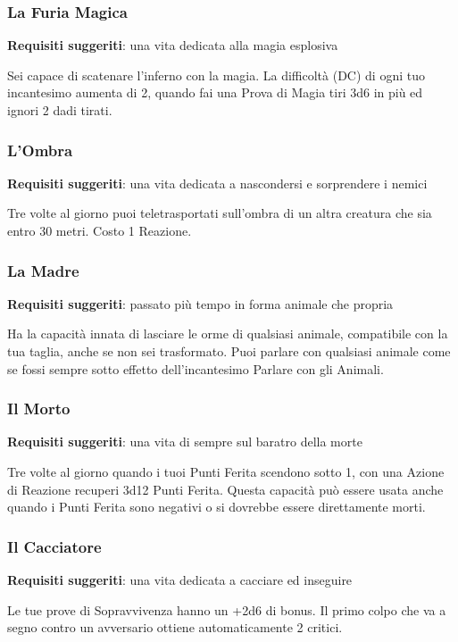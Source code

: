 \begin{multicols}{2}
\subsubsection{La Furia Magica}

\textbf{Requisiti suggeriti}: una vita dedicata alla magia esplosiva

Sei capace di scatenare l'inferno con la magia. La difficoltà (DC) di ogni tuo incantesimo aumenta di 2, quando fai una Prova di Magia tiri 3d6 in più ed ignori 2 dadi tirati.

\subsubsection{L'Ombra}

\textbf{Requisiti suggeriti}: una vita dedicata a nascondersi e sorprendere i nemici

Tre volte al giorno puoi teletrasportati sull'ombra di un altra creatura che sia entro 30 metri. Costo 1 Reazione.

\subsubsection{La Madre}

\textbf{Requisiti suggeriti}: passato più tempo in forma animale che propria

Ha la capacità innata di lasciare le orme di qualsiasi animale, compatibile con la tua taglia, anche se non sei trasformato. Puoi parlare con qualsiasi animale come se fossi sempre sotto effetto dell'incantesimo Parlare con gli Animali.

\subsubsection{Il Morto}

\textbf{Requisiti suggeriti}: una vita di sempre sul baratro della morte

Tre volte al giorno quando i tuoi Punti Ferita scendono sotto 1, con una Azione di Reazione recuperi 3d12 Punti Ferita. Questa capacità può essere usata anche quando i Punti Ferita sono negativi o si dovrebbe essere direttamente morti.

\subsubsection{Il Cacciatore}

\textbf{Requisiti suggeriti}: una vita dedicata a cacciare ed inseguire

Le tue prove di Sopravvivenza hanno un +2d6 di bonus. Il primo colpo che va a segno contro un avversario ottiene automaticamente 2 critici.

\end{multicols}

\pagebreak
